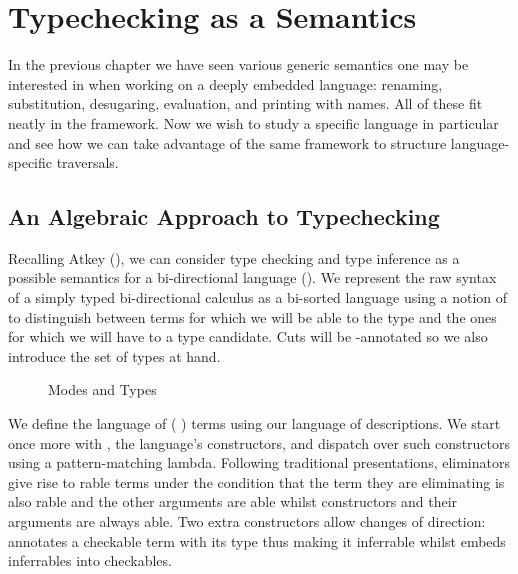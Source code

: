 \chapter{Typechecking as a Semantics}

In the previous chapter we have seen various generic semantics one may be interested in
when working on a deeply embedded language: renaming, substitution, desugaring,
evaluation, and printing with names. All of these fit neatly in the 
framework. Now we wish to study a specific language in particular and see how we can
take advantage of the same framework to structure language-specific traversals.

\section{An Algebraic Approach to Typechecking}\label{section:typechecking}

Recalling Atkey (\citeyear{atkey2015algebraic}), we can consider type checking
and type inference as a possible semantics for a bi-directional language
(\cite{pierce2000local}). We represent the raw syntax of a simply typed bi-directional
calculus as a bi-sorted language using a notion of  to distinguish between
terms for which we will be able to  the type and the ones for which we will
have to  a type candidate. Cuts will be -annotated so we also
introduce the set of types at hand.

\begin{figure}[h]
\begin{minipage}{0.5\textwidth}
\end{minipage}\begin{minipage}{0.5\textwidth}
\end{minipage}
\caption{Modes and Types}
\end{figure}

We define the language of ({ }) terms using our language of
descriptions. We start once more with , the language's constructors,
and dispatch over such constructors using a pattern-matching lambda. Following
traditional presentations, eliminators give rise to rable terms under
the condition that the term they are eliminating is also rable and
the other arguments are able whilst constructors and their arguments
are always able. Two extra constructors allow changes of direction:
 annotates a checkable term with its type thus making it inferrable whilst
 embeds inferrables into checkables.

